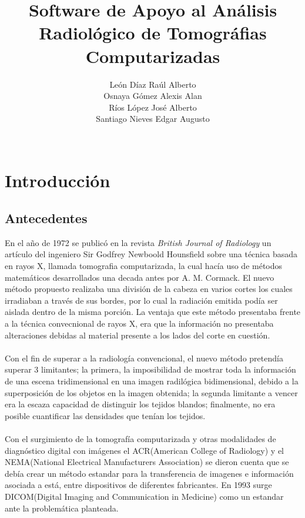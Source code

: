 \documentclass[12pt]{report}
\title{\bfseries Software de Apoyo al Análisis Radiológico de Tomográfias Computarizadas}
\author{León Díaz Raúl Alberto\\ Osnaya Gómez Alexis Alan\\ Ríos López José Alberto\\ Santiago Nieves Edgar Augusto\\ \\}
\begin{document}
\maketitle 
\chapter{Introducción}

\section{Antecedentes}
En el año de 1972 se publicó en la revista \textit{British Journal of Radiology} un artículo del ingeniero Sir Godfrey Newboold Hounsfield sobre una técnica basada en rayos X, llamada tomografia computarizada, la cual hacía uso de métodos matemáticos desarrollados una decada antes por A. M. Cormack.
El nuevo método propuesto realizaba una división de la cabeza en varios cortes los cuales irradiaban a través de sus bordes, por lo cual la radiación emitida podía ser aislada dentro de la misma porción. La ventaja que este método presentaba frente a la técnica convecnional de rayos X, era que la información no presentaba alteraciones debidas al material presente a los lados del corte en cuestión.\\ \\
Con el fin de superar a la radiología convencional, el nuevo método pretendía superar 3 limitantes; la primera, la imposibilidad de mostrar toda la información de una escena tridimensional en una imagen radilógica bidimensional, debido a la superposición de los objetos en la imagen obtenida; la segunda limitante a vencer era la escaza capacidad de distinguir los tejidos blandos; finalmente, no era posible cuantificar las densidades que tenían los tejidos.\cite{TCFundamentos}  \\ \\
Con el surgimiento de la tomografía computarizada y otras modalidades de diagnóstico digital con imágenes  el ACR(American College of Radiology) y el NEMA(National Electrical Manufacturers Association) se dieron cuenta que se debía crear un método estandar para la transferencia de imagenes e información asociada a está, entre dispositivos de diferentes fabricantes. En 1993 surge DICOM(Digital Imaging and Communication in Medicine) como un estandar ante la problemática planteada.\cite{DICOMNEMA} \\
\end{document}
